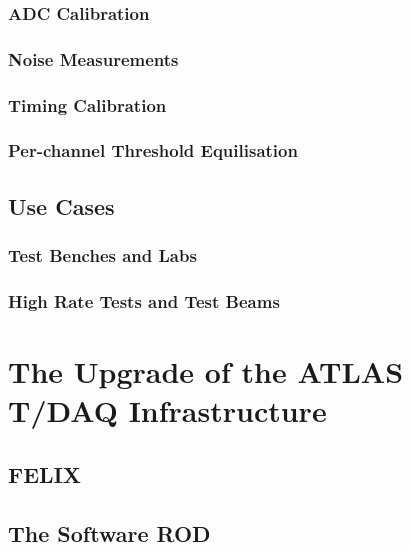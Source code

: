 \subsubsection{ADC Calibration}
\subsubsection{Noise Measurements}
\subsubsection{Timing Calibration}
\subsubsection{Per-channel Threshold Equilisation}
\subsection{Use Cases}
\subsubsection{Test Benches and Labs}
\subsubsection{High Rate Tests and Test Beams}

\section{The Upgrade of the ATLAS T/DAQ Infrastructure}
\subsection{FELIX}
\subsection{The Software ROD}
